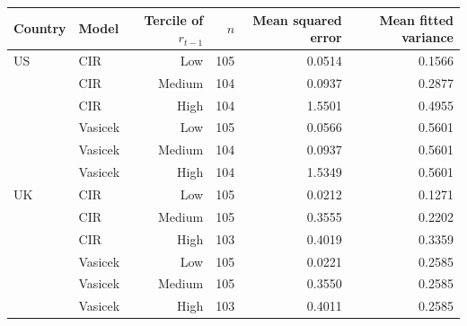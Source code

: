 \begin{tabular}{llrrrr}
\toprule
Country & Model & Tercile of $r_{t-1}$ & $n$ & Mean squared error & Mean fitted variance \\
\midrule
US & CIR & Low & 105 & 0.0514 & 0.1566 \\
 & CIR & Medium & 104 & 0.0937 & 0.2877 \\
 & CIR & High & 104 & 1.5501 & 0.4955 \\
 & Vasicek & Low & 105 & 0.0566 & 0.5601 \\
 & Vasicek & Medium & 104 & 0.0937 & 0.5601 \\
 & Vasicek & High & 104 & 1.5349 & 0.5601 \\
\midrule
UK & CIR & Low & 105 & 0.0212 & 0.1271 \\
 & CIR & Medium & 105 & 0.3555 & 0.2202 \\
 & CIR & High & 103 & 0.4019 & 0.3359 \\
 & Vasicek & Low & 105 & 0.0221 & 0.2585 \\
 & Vasicek & Medium & 105 & 0.3550 & 0.2585 \\
 & Vasicek & High & 103 & 0.4011 & 0.2585 \\
\bottomrule
\end{tabular}
